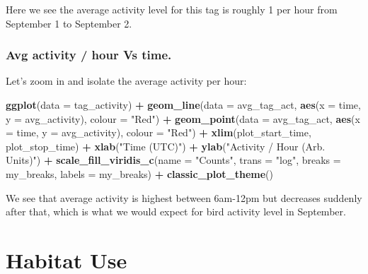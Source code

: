 \documentclass[
]{book}
\newenvironment{Shaded}{\begin{snugshade}}{\end{snugshade}}
\newcommand{\AttributeTok}[1]{\textcolor[rgb]{0.13,0.29,0.53}{#1}}
\newcommand{\FunctionTok}[1]{\textcolor[rgb]{0.13,0.29,0.53}{\textbf{#1}}}
\newcommand{\NormalTok}[1]{#1}
\newcommand{\SpecialCharTok}[1]{\textcolor[rgb]{0.81,0.36,0.00}{\textbf{#1}}}
\newcommand{\StringTok}[1]{\textcolor[rgb]{0.31,0.60,0.02}{#1}}
\begin{document}
Here we see the average activity level for this tag is roughly 1 per hour from September 1 to September 2.

\subsection{Avg activity / hour Vs time.}\label{avg-activity-hour-vs-time.}

Let's zoom in and isolate the average activity per hour:

\begin{Shaded}
\begin{Highlighting}[]
\FunctionTok{ggplot}\NormalTok{(}\AttributeTok{data =}\NormalTok{ tag\_activity) }\SpecialCharTok{+}
  \FunctionTok{geom\_line}\NormalTok{(}\AttributeTok{data =}\NormalTok{ avg\_tag\_act, }
            \FunctionTok{aes}\NormalTok{(}\AttributeTok{x =}\NormalTok{ time, }
                \AttributeTok{y =}\NormalTok{ avg\_activity),}
            \AttributeTok{colour =} \StringTok{"Red"}\NormalTok{) }\SpecialCharTok{+}
  \FunctionTok{geom\_point}\NormalTok{(}\AttributeTok{data =}\NormalTok{ avg\_tag\_act, }
             \FunctionTok{aes}\NormalTok{(}\AttributeTok{x =}\NormalTok{ time, }
                 \AttributeTok{y =}\NormalTok{ avg\_activity), }
             \AttributeTok{colour =} \StringTok{"Red"}\NormalTok{) }\SpecialCharTok{+}
  \FunctionTok{xlim}\NormalTok{(plot\_start\_time, plot\_stop\_time) }\SpecialCharTok{+}
  \FunctionTok{xlab}\NormalTok{(}\StringTok{"Time (UTC)"}\NormalTok{) }\SpecialCharTok{+}
  \FunctionTok{ylab}\NormalTok{(}\StringTok{"Activity / Hour (Arb. Units)"}\NormalTok{) }\SpecialCharTok{+}
  \FunctionTok{scale\_fill\_viridis\_c}\NormalTok{(}\AttributeTok{name =} \StringTok{"Counts"}\NormalTok{, }
                       \AttributeTok{trans =} \StringTok{"log"}\NormalTok{, }
                       \AttributeTok{breaks =}\NormalTok{ my\_breaks, }
                       \AttributeTok{labels =}\NormalTok{ my\_breaks) }\SpecialCharTok{+}
  \FunctionTok{classic\_plot\_theme}\NormalTok{()}
\end{Highlighting}
\end{Shaded}

We see that average activity is highest between 6am-12pm but decreases suddenly after that, which is what we would expect for bird activity level in September.

\chapter{Habitat Use}\label{habitat-use}
\end{document}
